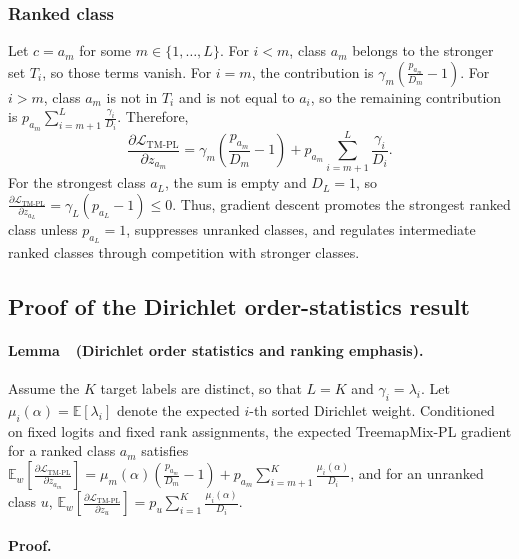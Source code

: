 \subsubsection*{Ranked class}

Let $c=a_m$ for some $m\in\{1,\dots,L\}$. For $i<m$, class $a_m$ belongs to the stronger set $T_i$, so those terms vanish. For $i=m$, the contribution is \(\gamma_m\left(\frac{p_{a_m}}{D_m}-1\right)\). For $i>m$, class $a_m$ is not in $T_i$ and is not equal to $a_i$, so the remaining contribution is \(p_{a_m}\sum_{i=m+1}^{L}\frac{\gamma_i}{D_i}\).
Therefore,
\[
\frac{\partial \mathcal{L}_{\mathrm{TM\text{-}PL}}}{\partial z_{a_m}}
=
\gamma_m
\left(
\frac{p_{a_m}}{D_m}-1
\right)
+
p_{a_m}
\sum_{i=m+1}^{L}
\frac{\gamma_i}{D_i}.
\]
For the strongest class $a_L$, the sum is empty and $D_L=1$, so \(\frac{\partial \mathcal{L}_{\mathrm{TM\text{-}PL}}}{\partial z_{a_L}}=\gamma_L(p_{a_L}-1)\le 0\).
Thus, gradient descent promotes the strongest ranked class unless $p_{a_L}=1$, suppresses unranked classes, and regulates intermediate ranked classes through competition with stronger classes.

\subsection{Proof of the Dirichlet order-statistics result}

\label{lem:pl-order}
\paragraph{Lemma~\thelemma\ (Dirichlet order statistics and ranking emphasis).}
Assume the $K$ target labels are distinct, so that $L=K$ and $\gamma_i=\lambda_i$. Let \(\mu_i(\alpha)=\mathbb{E}[\lambda_i]\) denote the expected $i$-th sorted Dirichlet weight. Conditioned on fixed logits and fixed rank assignments, the expected TreemapMix-PL gradient for a ranked class $a_m$ satisfies \(\mathbb{E}_{w}\left[\frac{\partial \mathcal{L}_{\mathrm{TM\text{-}PL}}}{\partial z_{a_m}}\right]=\mu_m(\alpha)\left(\frac{p_{a_m}}{D_m}-1\right)+p_{a_m}\sum_{i=m+1}^{K}\frac{\mu_i(\alpha)}{D_i}\), and for an unranked class $u$, \(\mathbb{E}_{w}\left[\frac{\partial \mathcal{L}_{\mathrm{TM\text{-}PL}}}{\partial z_u}\right]=p_u\sum_{i=1}^{K}\frac{\mu_i(\alpha)}{D_i}\).

\paragraph{Proof.}

